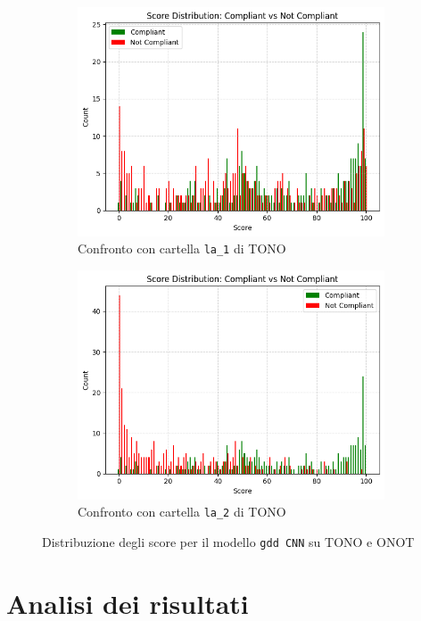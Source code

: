 \documentclass[12pt,a4paper,openright,twoside]{book}
\begin{document}
\begin{figure}[htbp]
    \centering
    \begin{subfigure}{0.49\textwidth}
        \centering
        \includegraphics[width=.7\linewidth]{figures/score-distribution-frontal-gaze-gdd-v3-la1.png}
        \caption{Confronto con cartella \texttt{la\_1} di TONO}
        \label{fig:score_distribution_frontal_gaze_gdd_v3_la1}
    \end{subfigure}
    \hfill
    \begin{subfigure}{0.49\textwidth}
        \centering
        \includegraphics[width=.7\linewidth]{figures/score-distribution-frontal-gaze-gdd-v3-la2.png}
        \caption{Confronto con cartella \texttt{la\_2} di TONO}
        \label{fig:score_distribution_frontal_gaze_gdd_v3_la2}
    \end{subfigure}
    \caption{Distribuzione degli score per il modello \texttt{gdd CNN} su TONO e ONOT}
\end{figure}


\section{Analisi dei risultati}
\end{document}
